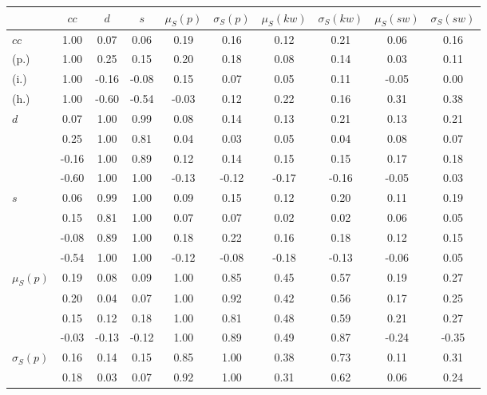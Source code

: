 \begin{table*}[h!]
\begin{center}
\begin{tabular}{| l | c | c | c | c | c | c | c | c | c |}\hline
 & $cc$ & $d$ & $s$ & $\mu_S(p)$ & $\sigma_S(p)$ & $\mu_S(kw)$ & $\sigma_S(kw)$ & $\mu_S(sw)$ & $\sigma_S(sw)$ \\\hline
$cc$ & 1.00  & 0.07  & 0.06  & 0.19  & 0.16  & 0.12  & 0.21  & 0.06  & 0.16 \\\hline
(p.) & 1.00  & 0.25  & 0.15  & 0.20  & 0.18  & 0.08  & 0.14  & 0.03  & 0.11 \\\hline
(i.) & 1.00  & -0.16  & -0.08  & 0.15  & 0.07  & 0.05  & 0.11  & -0.05  & 0.00 \\\hline
(h.) & 1.00  & -0.60  & -0.54  & -0.03  & 0.12  & 0.22  & 0.16  & 0.31  & 0.38 \\\hline
$d$ & 0.07  & 1.00  & 0.99  & 0.08  & 0.14  & 0.13  & 0.21  & 0.13  & 0.21 \\\hline
 & 0.25  & 1.00  & 0.81  & 0.04  & 0.03  & 0.05  & 0.04  & 0.08  & 0.07 \\\hline
 & -0.16  & 1.00  & 0.89  & 0.12  & 0.14  & 0.15  & 0.15  & 0.17  & 0.18 \\\hline
 & -0.60  & 1.00  & 1.00  & -0.13  & -0.12  & -0.17  & -0.16  & -0.05  & 0.03 \\\hline
$s$ & 0.06  & 0.99  & 1.00  & 0.09  & 0.15  & 0.12  & 0.20  & 0.11  & 0.19 \\\hline
 & 0.15  & 0.81  & 1.00  & 0.07  & 0.07  & 0.02  & 0.02  & 0.06  & 0.05 \\\hline
 & -0.08  & 0.89  & 1.00  & 0.18  & 0.22  & 0.16  & 0.18  & 0.12  & 0.15 \\\hline
 & -0.54  & 1.00  & 1.00  & -0.12  & -0.08  & -0.18  & -0.13  & -0.06  & 0.05 \\\hline
$\mu_S(p)$ & 0.19  & 0.08  & 0.09  & 1.00  & 0.85  & 0.45  & 0.57  & 0.19  & 0.27 \\\hline
 & 0.20  & 0.04  & 0.07  & 1.00  & 0.92  & 0.42  & 0.56  & 0.17  & 0.25 \\\hline
 & 0.15  & 0.12  & 0.18  & 1.00  & 0.81  & 0.48  & 0.59  & 0.21  & 0.27 \\\hline
 & -0.03  & -0.13  & -0.12  & 1.00  & 0.89  & 0.49  & 0.87  & -0.24  & -0.35 \\\hline
$\sigma_S(p)$ & 0.16  & 0.14  & 0.15  & 0.85  & 1.00  & 0.38  & 0.73  & 0.11  & 0.31 \\\hline
 & 0.18  & 0.03  & 0.07  & 0.92  & 1.00  & 0.31  & 0.62  & 0.06  & 0.24 \\\hline

\end{tabular}
\end{center}
\end{table*}
